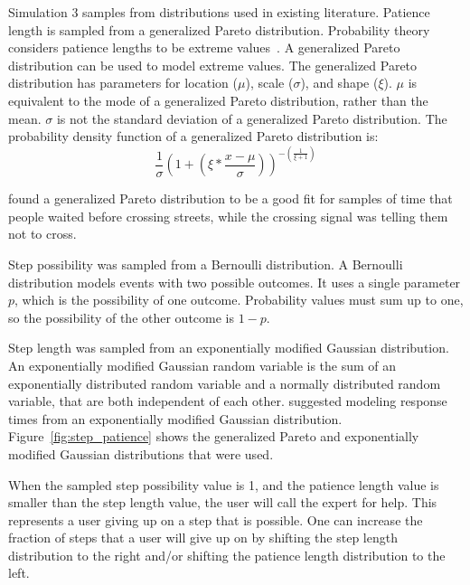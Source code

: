 Simulation 3 samples from distributions used in existing literature.
Patience length is sampled from a generalized Pareto distribution.
Probability theory considers patience lengths to be extreme
values~\cite{patience}.
A generalized Pareto distribution can be used to model extreme values.
The generalized Pareto distribution has parameters for location ($\mu$), scale
($\sigma$), and shape ($\xi$).
$\mu$ is equivalent to the mode of a generalized Pareto distribution, rather than
the mean.
$\sigma$ is not the standard deviation of a generalized Pareto distribution.
The probability density function of a generalized Pareto distribution is:
\[
  \frac{1}{\sigma} (1 + (\xi * \frac{x - \mu}{\sigma}))^{-(\frac{1}{\xi + 1})}
\]


\citet{patience} found a generalized Pareto distribution to be a good fit for
samples of time that people waited before crossing streets, while the crossing
signal was telling them not to cross.

Step possibility was sampled from a Bernoulli distribution.
A Bernoulli distribution models events with two possible outcomes.
It uses a single parameter $p$, which is the possibility of one outcome.
Probability values must sum up to one, so the possibility of the other outcome
is $1-p$.

Step length was sampled from an exponentially modified Gaussian distribution.
An exponentially modified Gaussian random variable is the sum of an
exponentially distributed random variable and a normally distributed random
variable, that are both independent of each other.
\citet{dawson1988fitting} suggested modeling response times from an
exponentially modified Gaussian distribution.
Figure~\ref{fig:step_patience} shows the generalized Pareto and exponentially
modified Gaussian distributions that were used.

When the sampled step possibility value is 1, and the patience length value is
smaller than the step length value, the user will call the expert for help.
This represents a user giving up on a step that is possible.
One can increase the fraction of steps that a user will give up on by shifting
the step length distribution to the right and/or shifting the patience length
distribution to the left.


